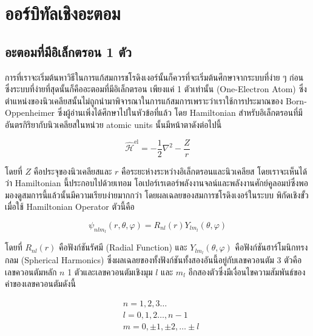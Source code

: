 \section{ออร์บิทัลเชิงอะตอม}

\subsection{อะตอมที่มีอิเล็กตรอน 1 ตัว}

การที่เราจะเริ่มต้นหาวิธีในการแก้สมการชโรดิงเงอร์นั้นก็ควรที่จะเริ่มต้นศึกษาจากระบบที่ง่าย ๆ ก่อนซึ่งระบบที่ง่ายที่สุดนั้นก็คืออะตอมที่มีอิเล็กตรอน%
เพียงแค่ 1 ตัวเท่านั้น (One-Electron Atom)  ซึ่งตำแหน่งของนิวเคลียสนั้นไม่ถูกนำมาพิจารณาในการแก้สมการเพราะว่าเราใช้การประมาณของ
Born-Oppenheimer ซึ่งผู้อ่านเพิ่งได้ศึกษาไปในหัวข้อที่แล้ว โดย Hamiltonian สำหรับอิเล็กตรอนที่มีอันตรกิริยากับนิวเคลียสในหน่วย atomic
units นั้นมีหน้าตาดังต่อไปนี้

\begin{equation}
    \hat{\mathscr{H}}^{\text{el}}
    =
    - \frac{1}{2} \nabla^{2}-\frac{Z}{r}
\end{equation}

โดยที่ $Z$ คือประจุของนิวเคลียสและ $r$ คือระยะห่างระหว่างอิเล็กตรอนและนิวเคลียส โดยเราจะเห็นได้ว่า Hamiltonian นี้ประกอบไปด้วยเทอม%
โอเปอร์เรเตอร์พลังงานจลน์และพลังงานศักย์คูลอมบ์ซึ่งพอมองดูสมการนี้แล้วนั้นมีความเรียบง่ายมากกว่า โดยผลเฉลยของสมการชโรดิงเงอร์ในระบบ%
พิกัดเชิงขั้วเมื่อใช้ Hamiltonian Operator ตัวนี้คือ

\begin{equation}
    \psi_{nlm_{l}} (r, \theta, \varphi)
    =
    R_{nl}(r) Y_{lm_{l}} (\theta, \varphi)
\end{equation}

\noindent โดยที่ $R_{nl}(r)$ คือฟังก์ชันรัศมี (Radial Function) และ $Y_{lm_{l}}(\theta, \varphi)$ คือฟังก์ชันฮาร์โมนิกทรงกลม
(Spherical Harmonics) ซึ่งผลเฉลยของทั้งฟังก์ชันทั้งสองอันนี้อยู่กับเลขควอนตัม 3 ตัวคือเลขควอนตัมหลัก $n$ 1 ตัวและเลขควอนตัมเชิงมุม
$l$ และ $m_{l}$ อีกสองตัวซึ่งมีเงื่อนไขความสัมพันธ์ของค่าของเลขควอนตัมดังนี้

\begin{equation*}
    \begin{aligned}
         & n = 1,2,3 \ldots                  \\
         & l = 0,1,2 \ldots, n-1             \\
         & m = 0, \pm 1, \pm 2, \ldots \pm l
    \end{aligned}
\end{equation*}

